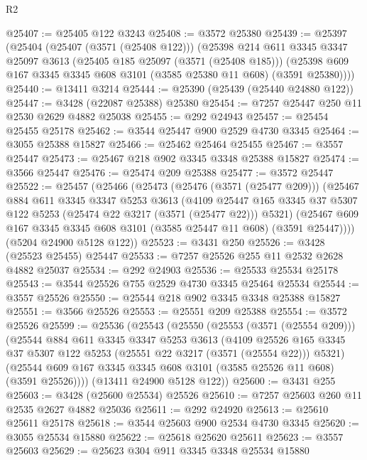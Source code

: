 \begin{lexlean}{R2}
\begin{coremodule}
@25407 := @25405 @122 @3243
@25408 := @3572 @25380
@25439 := @25397
    (@25404
      (@25407 (@3571 (@25408 @122)))
      (@25398
        @214
        @611
        @3345
        @3347
        @25097
        @3613
        (@25405 @185 @25097 (@3571 (@25408 @185)))
        (@25398 @609 @167 @3345 @3345 @608 @3101 (@3585 @25380 @11 @608) (@3591 @25380))))
@25440 := @13411 @3214
@25444 := @25390 (@25439 (@25440 @24880 @122))
@25447 := @3428 (@22087 @25388) @25380
@25454 := @7257 @25447 @250 @11 @2530 @2629 @4882 @25038
@25455 := @292 @24943
@25457 := @25454 @25455 @25178
@25462 := @3544 @25447 @900 @2529 @4730 @3345
@25464 := @3055 @25388 @15827
@25466 := @25462 @25464 @25455
@25467 := @3557 @25447
@25473 := @25467 @218 @902 @3345 @3348 @25388 @15827
@25474 := @3566 @25447
@25476 := @25474 @209 @25388
@25477 := @3572 @25447
@25522 := @25457
    (@25466
      (@25473
        (@25476 (@3571 (@25477 @209)))
        (@25467
          @884
          @611
          @3345
          @3347
          @5253
          @3613
          (@4109
            @25447
            @165
            @3345
            @37
            @5307
            @122
            @5253
            (@25474 @22 @3217 (@3571 (@25477 @22)))
            @5321)
          (@25467 @609 @167 @3345 @3345 @608 @3101 (@3585 @25447 @11 @608) (@3591 @25447))))
      (@5204 @24900 @5128 @122))
@25523 := @3431 @250
@25526 := @3428 (@25523 @25455) @25447
@25533 := @7257 @25526 @255 @11 @2532 @2628 @4882 @25037
@25534 := @292 @24903
@25536 := @25533 @25534 @25178
@25543 := @3544 @25526 @755 @2529 @4730 @3345 @25464 @25534
@25544 := @3557 @25526
@25550 := @25544 @218 @902 @3345 @3348 @25388 @15827
@25551 := @3566 @25526
@25553 := @25551 @209 @25388
@25554 := @3572 @25526
@25599 := @25536
    (@25543
      (@25550
        (@25553 (@3571 (@25554 @209)))
        (@25544
          @884
          @611
          @3345
          @3347
          @5253
          @3613
          (@4109
            @25526
            @165
            @3345
            @37
            @5307
            @122
            @5253
            (@25551 @22 @3217 (@3571 (@25554 @22)))
            @5321)
          (@25544 @609 @167 @3345 @3345 @608 @3101 (@3585 @25526 @11 @608) (@3591 @25526))))
      (@13411 @24900 @5128 @122))
@25600 := @3431 @255
@25603 := @3428 (@25600 @25534) @25526
@25610 := @7257 @25603 @260 @11 @2535 @2627 @4882 @25036
@25611 := @292 @24920
@25613 := @25610 @25611 @25178
@25618 := @3544 @25603 @900 @2534 @4730 @3345
@25620 := @3055 @25534 @15880
@25622 := @25618 @25620 @25611
@25623 := @3557 @25603
@25629 := @25623 @304 @911 @3345 @3348 @25534 @15880

\end{coremodule}
\end{lexlean}

